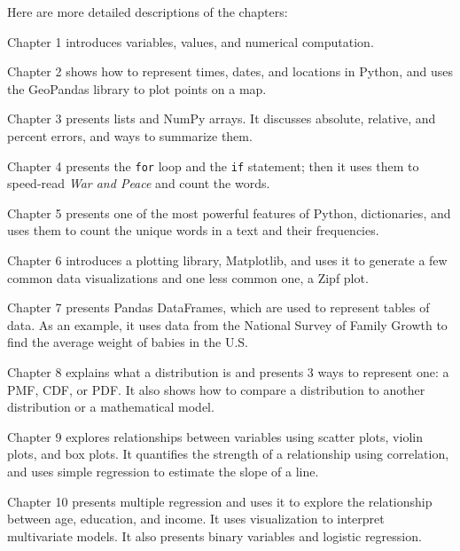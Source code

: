 Here are more detailed descriptions of the chapters:

\begin{description}

\item Chapter 1 introduces variables, values, and numerical computation.

\item Chapter 2 shows how to represent times,
dates, and locations in Python, and uses the GeoPandas library to plot
points on a map.

\item Chapter 3 presents lists and NumPy
arrays. It discusses absolute, relative, and percent errors, and ways to
summarize them.

\item Chapter 4 presents the \texttt{for} loop
and the \texttt{if} statement; then it uses them to speed-read \emph{War
and Peace} and count the words.

\item Chapter 5 presents one of the most powerful
features of Python, dictionaries, and uses them to count the unique
words in a text and their frequencies.

\item Chapter 6 introduces a plotting library,
Matplotlib, and uses it to generate a few common data visualizations and
one less common one, a Zipf plot.

\item Chapter 7 presents Pandas DataFrames, which are used
to represent tables of data. As an example, it uses data from the
National Survey of Family Growth to find the average weight of babies in
the U.S.

\item Chapter 8 explains what a distribution is and presents 3 ways to represent one: a PMF, CDF, or PDF. It also shows
how to compare a distribution to another distribution or a mathematical
model.

\item Chapter 9 explores relationships between
variables using scatter plots, violin plots, and box plots. It
quantifies the strength of a relationship using correlation,
and uses simple regression to estimate the slope of a line.

\item Chapter 10 presents multiple regression and uses
it to explore the relationship between age, education, and income. It
uses visualization to interpret multivariate models. It also presents
binary variables and logistic regression.


\end{description}
